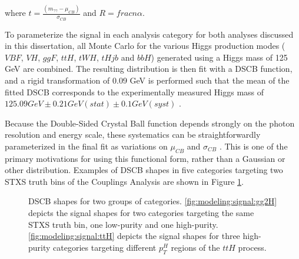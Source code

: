 where $t = \frac{(m_{\gamma \gamma} - \mu_{CB})}{\sigma_{CB}}$ and $R = frac{n}{\alpha}$. 

To parameterize the signal in each analysis category for both analyses discussed in this dissertation, all Monte Carlo for the various Higgs production modes ($VBF$, $VH$, $ggF$, $ttH$, $tWH$, $tHjb$ and $bbH$) generated using a Higgs mass of 125 GeV are combined. The resulting distribution is then fit with a DSCB function, and a rigid transformation of 0.09 GeV is performed such that the mean of the fitted DSCB corresponds to the experimentally measured Higgs mass of $125.09 GeV \pm 0.21 GeV(stat) \pm 0.1 GeV(syst)$ \cite{Higgsmass}.

Because the Double-Sided Crystal Ball function depends strongly on the photon resolution and energy scale, these systematics can be straightforwardly parameterized in the final fit as variations on $\mu_{CB}$ and $\sigma_{CB}$ \cite{gammaID}. This is one of the primary motivations for using this functional form, rather than a Gaussian or other distribution. Examples of DSCB shapes in five categories targeting two STXS truth bins of the Couplings Analysis are shown in Figure \ref{fig:DSCB}.

\begin{figure}[h]
\centering
{}
\caption{DSCB shapes for two groups of categories. \ref{fig:modeling:signal:gg2H} depicts the signal shapes for two categories targeting the same STXS truth bin, one low-purity and one high-purity. \ref{fig:modeling:signal:ttH} depicts the signal shapes for three high-purity categories targeting different $p_{T}^{H}$ regions of the $ttH$ process.}
\label{fig:DSCB}
\end{figure}

